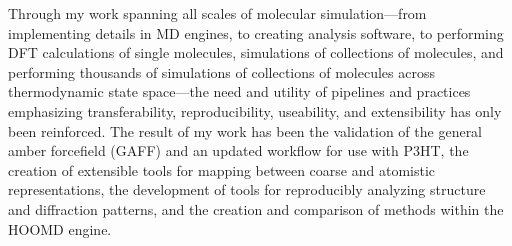 Through my work spanning all scales of molecular simulation---from implementing details in MD engines, to creating analysis software, to performing DFT calculations of single molecules, simulations of collections of molecules, and performing thousands of simulations of collections of molecules across thermodynamic state space---the need and utility of pipelines and practices emphasizing transferability, reproducibility, useability, and extensibility has only been reinforced.
The result of my work has been the validation of the general amber forcefield (GAFF) and an updated workflow for use with P3HT, the creation of extensible tools for mapping between coarse and atomistic representations, the development of tools for reproducibly analyzing structure and diffraction patterns, and the creation and comparison of methods within the HOOMD engine.


